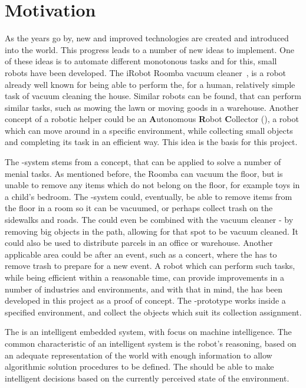 \section{Motivation} \label{sec:motivation}

As the years go by, new and improved technologies are created and introduced into the world. This progress leads to a number of new ideas to implement. One of these ideas is to automate different monotonous tasks and for this, small robots have been developed. The iRobot Roomba vacuum cleaner~\citep{roomba}, is a robot already well known for being able to perform the, for a human, relatively simple task of vacuum cleaning the house. Similar robots can be found, that can perform similar tasks, such as mowing the lawn or moving goods in a warehouse. Another concept of a robotic helper could be an \textbf{A}utonomous \textbf{R}obot \textbf{C}ollector (\projname{}), a robot which can move around in a specific environment, while collecting small objects and completing its task in an efficient way. This idea is the basis for this project.

The \projname{}-system stems from a concept, that can be applied to solve a number of menial tasks. As mentioned before, the Roomba can vacuum the floor, but is unable to remove any items which do not belong on the floor, for example toys in a child's bedroom. The \projname{}-system could, eventually, be able to remove items from the floor in a room so it can be vacuumed, or perhaps collect trash on the sidewalks and roads. The \projname{} could even be combined with the vacuum cleaner - by removing big objects in the path, allowing for that spot to be vacuum cleaned. It could also be used to distribute parcels in an office or warehouse. Another applicable area could be after an event, such as a concert, where the \projname{} has to remove trash to prepare for a new event. A robot which can perform such tasks, while being efficient within a reasonable time, can provide improvements in a number of industries and environments, and with that in mind, the \projname{} has been developed in this project as a proof of concept. The \projname{}-prototype works inside a specified environment, and collect the objects which suit its collection assignment.

The \projname{} is an intelligent embedded system, with focus on machine intelligence. The common characteristic of an intelligent system is the robot's reasoning, based on an adequate representation of the world with enough information to allow algorithmic solution procedures to be defined. The \projname{} should be able to make intelligent decisions based on the currently perceived state of the environment.


